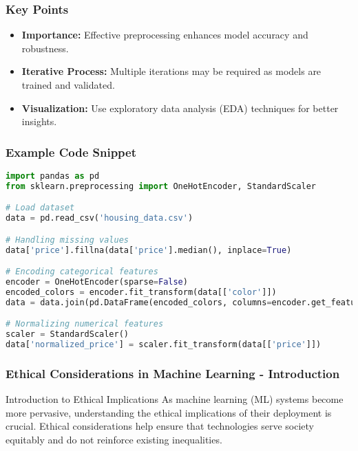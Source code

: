 \documentclass[aspectratio=169]{beamer}
\begin{document}
\begin{frame}[fragile]
    \frametitle{Key Points}
    \begin{itemize}
        \item \textbf{Importance:} Effective preprocessing enhances model accuracy and robustness.
        \item \textbf{Iterative Process:} Multiple iterations may be required as models are trained and validated.
        \item \textbf{Visualization:} Use exploratory data analysis (EDA) techniques for better insights.
    \end{itemize}
\end{frame}

\begin{frame}[fragile]
    \frametitle{Example Code Snippet}
    \begin{lstlisting}[language=Python]
import pandas as pd
from sklearn.preprocessing import OneHotEncoder, StandardScaler

# Load dataset
data = pd.read_csv('housing_data.csv')

# Handling missing values
data['price'].fillna(data['price'].median(), inplace=True)

# Encoding categorical features
encoder = OneHotEncoder(sparse=False)
encoded_colors = encoder.fit_transform(data[['color']])
data = data.join(pd.DataFrame(encoded_colors, columns=encoder.get_feature_names(['color'])))

# Normalizing numerical features
scaler = StandardScaler()
data['normalized_price'] = scaler.fit_transform(data[['price']])
    \end{lstlisting}
\end{frame}

\begin{frame}[fragile]
    \frametitle{Ethical Considerations in Machine Learning - Introduction}
    \begin{block}{Introduction to Ethical Implications}
        As machine learning (ML) systems become more pervasive, understanding the ethical implications of their deployment is crucial. Ethical considerations help ensure that technologies serve society equitably and do not reinforce existing inequalities.
    \end{block}
\end{frame}
\end{document}
